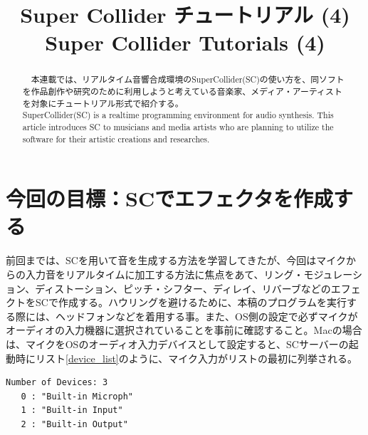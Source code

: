 \documentclass{jsarticle}
\title{Super Collider チュートリアル (4)\\ 
Super Collider Tutorials (4)
}
\begin{document}
\makeatletter 
\def\ps@myheadings{%
\let\ps@jpl@in\ps@plain%
\def\@evenhead{\reset@font\hfil\leftmark\hfil}%
\def\@oddhead{\reset@font\hfil\rightmark\hfil}%
\let\@mkboth\@gobbletwo%
\let\sectionmark\@gobble%
\let\subsectionmark\@gobble%
% 
\def\@oddfoot{\reset@font\hfil-- \thepage --\hfil}%
\let\@evenfoot\@oddfoot 
} 
\makeatother 


\setcounter{page}{ 3 } 
\pagestyle{myheadings} 




\maketitle
\thispagestyle{myheadings}

%
\begin{abstract}
　本連載では、リアルタイム音響合成環境のSuperCollider(SC)の使い方を、同ソフトを作品創作や研究のために利用しようと考えている音楽家、メディア・アーティストを対象にチュートリアル形式で紹介する。\\
SuperCollider(SC) is a realtime programming environment for audio synthesis. This article introduces SC to musicians and media artists who are planning to utilize the software for their artistic creations and researches.

\end{abstract}
%
\section{今回の目標：SCでエフェクタを作成する}
前回までは、SCを用いて音を生成する方法を学習してきたが、今回はマイクからの入力音をリアルタイムに加工する方法に焦点をあて、リング・モジュレーション、ディストーション、ピッチ・シフター、ディレイ、リバーブなどのエフェクトをSCで作成する。ハウリングを避けるために、本稿のプログラムを実行する際には、ヘッドフォンなどを着用する事。また、OS側の設定で必ずマイクがオーディオの入力機器に選択されていることを事前に確認すること。Macの場合は、マイクをOSのオーディオ入力デバイスとして設定すると、SCサーバーの起動時にリスト\ref{device_list}のように、マイク入力がリストの最初に列挙される。

\begin{lstlisting}[caption=入出力デバイスのリスト,label=device_list]
Number of Devices: 3
   0 : "Built-in Microph"
   1 : "Built-in Input"
   2 : "Built-in Output"
\end{lstlisting}
\end{document}
